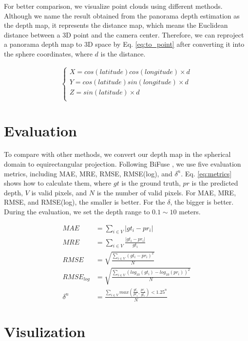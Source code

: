 For better comparison, we visualize point clouds using different methods. Although we name the result obtained from the panorama depth estimation as the depth map, it represents the distance map, which means the Euclidean distance between a 3D point and the camera center. Therefore, we can reproject a panorama depth map to 3D space by Eq. \ref{eq:to_point} after converting it into the sphere coordinates, where $d$ is the distance.

\begin{align}
	\label{eq:to_point}
	\begin{cases}
		X = cos(latitude)cos(longitude) \times d\\
		Y = cos(latitude)sin(longitude) \times d\\ 
		Z = sin(latitude) \times d\\
	\end{cases}
\end{align}

\section{Evaluation}

To compare with other methods, we convert our depth map in the spherical domain to equirectangular projection. Following BiFuse \cite{wang2020bifuse}, we use five evaluation metrics, including MAE, MRE, RMSE, RMSE(log), and $\delta ^n$. Eq. \ref{eq:metrics} shows how to calculate them, where $gt$ is the ground truth, $pr$ is the predicted depth, $V$ is valid pixels, and $N$ is the number of valid pixels. For MAE, MRE, RMSE, and RMSE(log), the smaller is better. For the $\delta$, the bigger is better. During the evaluation, we set the depth range to $0.1 \sim 10$ meters.

\begin{equation} 
\label{eq:metrics}
\begin{split}
MAE &= \sum_{i\in V}{|gt_i-pr_i|}   \\
MRE &= \sum_{i\in V}{\frac{|gt_i-pr_i|}{gt_i}} \\
RMSE &= \sqrt{\frac{\sum_{i\in V}(gt_i-pr_i)^2}{N}} \\
RMSE_{log} & = \sqrt{\frac{\sum_{i\in V}(log_{10}(gt_i)-log_{10}(pr_i))^2}{N}} \\
\delta^n & = \frac{\sum_{i\in V}max(\frac{gt_i}{pr_i},\frac{pr_i}{gt_i})<1.25^n}{N}
\end{split}
\end{equation}


\section{Visulization}

